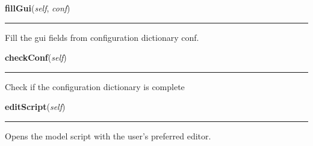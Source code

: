     \label{epigrass:MainPanel_Impl:fillGui}

    \vspace{0.5ex}

    \begin{boxedminipage}{\textwidth}

    \raggedright \textbf{fillGui}(\textit{self}, \textit{conf})

    \vspace{-1.5ex}

    \rule{\textwidth}{0.5\fboxrule}
    Fill the gui fields from configuration dictionary conf.

    \vspace{1ex}

    \end{boxedminipage}

    \label{epigrass:MainPanel_Impl:checkConf}

    \vspace{0.5ex}

    \begin{boxedminipage}{\textwidth}

    \raggedright \textbf{checkConf}(\textit{self})

    \vspace{-1.5ex}

    \rule{\textwidth}{0.5\fboxrule}
    Check if the configuration dictionary is complete

    \vspace{1ex}

    \end{boxedminipage}

    \label{epigrass:MainPanel_Impl:editScript}

    \vspace{0.5ex}

    \begin{boxedminipage}{\textwidth}

    \raggedright \textbf{editScript}(\textit{self})

    \vspace{-1.5ex}

    \rule{\textwidth}{0.5\fboxrule}
    Opens the model script with the user's preferred editor.

    \vspace{1ex}

    \end{boxedminipage}

